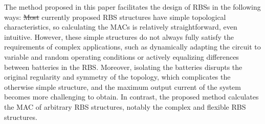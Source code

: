 \documentclass{article}
\providecommand{\DIFadd}[1]{{\protect\color{blue}\uwave{#1}}} %
\providecommand{\DIFdel}[1]{{\protect\color{red}\sout{#1}}}                      %
\providecommand{\DIFaddbegin}{} %
\providecommand{\DIFaddend}{} %
\providecommand{\DIFdelbegin}{} %
\providecommand{\DIFdelend}{} %
\newcommand{\DIFscaledelfig}{0.5}
\newlength{\DIFdelgraphicswidth} %
\newlength{\DIFdelgraphicsheight} %
\newcommand{\DIFaddincludegraphics}[2][]{{\color{blue}\fbox{\DIFOincludegraphics[#1]{#2}}}} %
\newcommand{\DIFdelincludegraphics}[2][]{%
\sbox{\DIFdelgraphicsbox}{\DIFOincludegraphics[#1]{#2}}%
\settoboxwidth{\DIFdelgraphicswidth}{\DIFdelgraphicsbox} %
\settoboxtotalheight{\DIFdelgraphicsheight}{\DIFdelgraphicsbox} %
\scalebox{\DIFscaledelfig}{%
\parbox[b]{\DIFdelgraphicswidth}{\usebox{\DIFdelgraphicsbox}\\[-\baselineskip] \rule{\DIFdelgraphicswidth}{0em}}\llap{\resizebox{\DIFdelgraphicswidth}{\DIFdelgraphicsheight}{%
\setlength{\unitlength}{\DIFdelgraphicswidth}%
\begin{picture}(1,1)%
\thicklines\linethickness{2pt} %
{\color[rgb]{1,0,0}\put(0,0){\framebox(1,1){}}}%
{\color[rgb]{1,0,0}\put(0,0){\line( 1,1){1}}}%
{\color[rgb]{1,0,0}\put(0,1){\line(1,-1){1}}}%
\end{picture}%
}\hspace*{3pt}}} %
} %
\DeclareRobustCommand{\DIFaddbegin}{\DIFOaddbegin \let\includegraphics\DIFaddincludegraphics} %
\DeclareRobustCommand{\DIFaddend}{\DIFOaddend \let\includegraphics\DIFOincludegraphics} %
\DeclareRobustCommand{\DIFdelbegin}{\DIFOdelbegin \let\includegraphics\DIFdelincludegraphics} %
\DeclareRobustCommand{\DIFdelend}{\DIFOaddend \let\includegraphics\DIFOincludegraphics} %
\begin{document}
The method proposed in this paper facilitates the design of RBSs in the following ways:
\DIFdelbegin \DIFdel{Most }\DIFdelend \DIFaddbegin \DIFadd{most }\DIFaddend currently proposed RBS structures \cite{ciNovelDesignAdaptive2007,alahmadBatterySwitchArray2008,kimDependableEfficientScalable2010b,kimBalancedReconfigurationStorage2011a,taesickimSeriesconnectedSelfreconfigurableMulticell2012a,6843711} have simple topological characteristics, so calculating the MACs is relatively straightforward, even intuitive.
However, these simple structures do not always fully satisfy the requirements of complex applications, such as dynamically adapting the circuit to variable and random operating conditions or actively equalizing differences between batteries in the RBS.
Moreover, isolating the batteries disrupts the original regularity and symmetry of the topology, which complicates the otherwise simple structure, and the maximum output current of the system becomes more challenging to obtain.
In contrast, the proposed method calculates the MAC of arbitrary RBS structures, notably the complex and flexible RBS structures.
\end{document}
